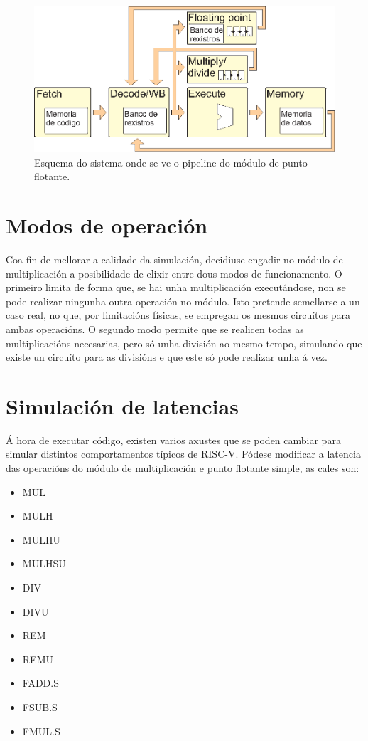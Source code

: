 \begin{figure}[hp!]
  \centering
  \includegraphics[width=\textwidth]{imaxes/pipelinePF.EPS}
  \caption{Esquema do sistema onde se ve o pipeline do módulo de punto flotante.}
  \label{fig:pipelinePF}
\end{figure}

\section{Modos de operación}\label{sec:modos_op}
Coa fin de mellorar a calidade da simulación, decidiuse engadir no módulo de multiplicación a posibilidade de elixir entre dous modos de funcionamento. O primeiro limita de forma que, se hai unha multiplicación executándose, non se pode realizar ningunha outra operación no módulo. Isto pretende semellarse a un caso real, no que, por limitacións físicas, se empregan os mesmos circuítos para ambas operacións. O segundo modo permite que se realicen todas as multiplicacións necesarias, pero só unha división ao mesmo tempo, simulando que existe un circuíto para as divisións e que este só pode realizar unha á vez.


\section{Simulación de latencias}\label{sec:sim_latencias}
Á hora de executar código, existen varios axustes que se poden cambiar para simular distintos comportamentos típicos de RISC-V. Pódese modificar a latencia  das operacións do módulo de multiplicación e punto flotante simple, as cales son: 
\begin{itemize}
    \item MUL
    \item MULH
    \item MULHU
    \item MULHSU
    \item DIV
    \item DIVU
    \item REM
    \item REMU
    \item FADD.S
    \item FSUB.S
    \item FMUL.S
\end{itemize}

